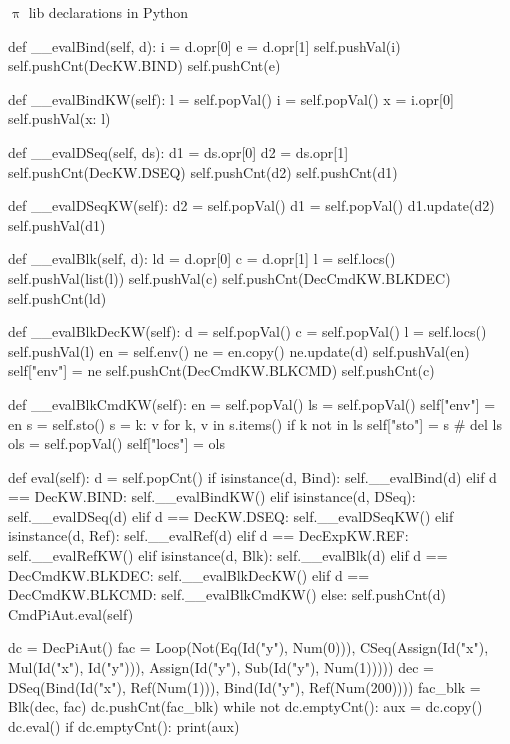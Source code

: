 \documentclass{beamer}
\begin{document}
\begin{frame}{{\color{red}$\uppi$ lib} declarations in Python}
\begin{python}
   def __evalBind(self, d):
       i = d.opr[0]
       e = d.opr[1]
       self.pushVal(i)
       self.pushCnt(DecKW.BIND)
       self.pushCnt(e)

   def __evalBindKW(self):
       l = self.popVal()
       i = self.popVal()
       x = i.opr[0]
       self.pushVal({x: l})

   def __evalDSeq(self, ds):
       d1 = ds.opr[0]
       d2 = ds.opr[1]
       self.pushCnt(DecKW.DSEQ)
       self.pushCnt(d2)
       self.pushCnt(d1)

   def __evalDSeqKW(self):
       d2 = self.popVal()
       d1 = self.popVal()
       d1.update(d2)
       self.pushVal(d1)

   def __evalBlk(self, d):
       ld = d.opr[0]
       c = d.opr[1]
       l = self.locs()
       self.pushVal(list(l))
       self.pushVal(c)
       self.pushCnt(DecCmdKW.BLKDEC)
       self.pushCnt(ld)

   def __evalBlkDecKW(self):
       d = self.popVal()
       c = self.popVal()
       l = self.locs()
       self.pushVal(l)
       en = self.env()
       ne = en.copy()
       ne.update(d)
       self.pushVal(en)
       self["env"] = ne
       self.pushCnt(DecCmdKW.BLKCMD)
       self.pushCnt(c)

   def __evalBlkCmdKW(self):
       en = self.popVal()
       ls = self.popVal()
       self["env"] = en
       s = self.sto()
       s = {k: v for k, v in s.items() if k not in ls}
       self["sto"] = s
       # del ls
       ols = self.popVal()
       self["locs"] = ols

   def eval(self):
       d = self.popCnt()
       if isinstance(d, Bind):
           self.__evalBind(d)
       elif d == DecKW.BIND:
           self.__evalBindKW()
       elif isinstance(d, DSeq):
           self.__evalDSeq(d)
       elif d == DecKW.DSEQ:
           self.__evalDSeqKW()
       elif isinstance(d, Ref):
           self.__evalRef(d)
       elif d == DecExpKW.REF:
           self.__evalRefKW()
       elif isinstance(d, Blk):
           self.__evalBlk(d)
       elif d == DecCmdKW.BLKDEC:
           self.__evalBlkDecKW()
       elif d == DecCmdKW.BLKCMD:
           self.__evalBlkCmdKW()
       else:
           self.pushCnt(d)
           CmdPiAut.eval(self)
\end{python}

\framebreak

\begin{python}
dc = DecPiAut()
fac = Loop(Not(Eq(Id("y"), Num(0))),
          CSeq(Assign(Id("x"), Mul(Id("x"), Id("y"))),
               Assign(Id("y"), Sub(Id("y"), Num(1)))))
dec = DSeq(Bind(Id("x"), Ref(Num(1))),
          Bind(Id("y"), Ref(Num(200))))
fac_blk = Blk(dec, fac)
dc.pushCnt(fac_blk)
while not dc.emptyCnt():
   aux = dc.copy()
   dc.eval()
   if dc.emptyCnt():
       print(aux)
\end{python}

\end{frame}
\end{document}

